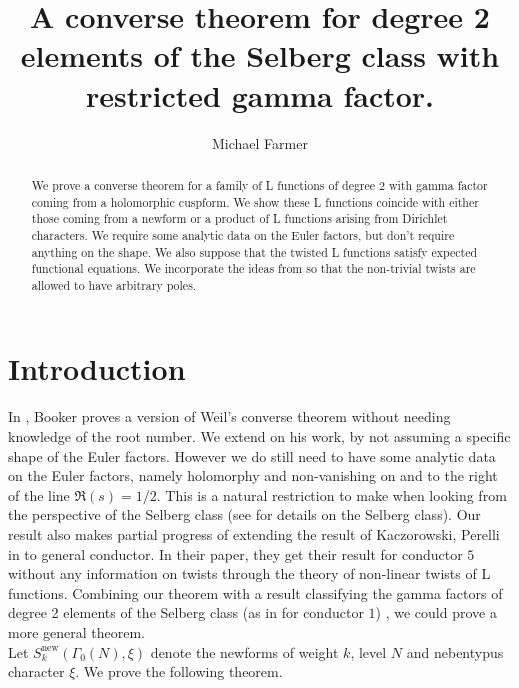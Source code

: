 \documentclass[a4paper,12.5pt]{amsart}
\title{A converse theorem for degree 2 elements of the Selberg class with restricted gamma factor.}
\author{Michael Farmer}
\theoremstyle{definition}
\theoremstyle{remark}
\begin{document}
\maketitle
\begin{abstract}
    We  prove a converse theorem for a family of L functions of degree 2  with gamma factor coming from a holomorphic cuspform. We show these L functions coincide with either those coming from a newform or a product of L functions arising from Dirichlet characters. We require some analytic data on the Euler factors, but don't require anything on the shape. We also suppose that the twisted L functions satisfy expected functional equations. We incorporate the ideas from \cite{booker2014weil} so that the non-trivial twists are allowed to have arbitrary poles. 
\end{abstract}
\section{Introduction}
In \cite{Converse}, Booker proves a version of Weil's converse theorem without needing knowledge of the root number. We extend on his work, by not assuming a specific shape of the Euler factors. However we do still need to have some analytic data on the Euler factors, namely holomorphy and non-vanishing on and to the right of the line $\Re(s)=1/2$. This is a natural restriction to make when looking from the perspective of the Selberg class (see  \cite{perelli2005survey} for details on the Selberg class).
Our result also makes partial progress of extending the result of Kaczorowski, Perelli in \cite{kaczorowski2018hecke} to general conductor. In their paper, they get their result for conductor $5$ without any information on twists through the theory of non-linear twists of L functions. Combining our theorem with a result classifying the gamma factors of degree 2 elements of the Selberg class (as in \cite{kaczorowski2020classification} for conductor $1$) , we could prove a more general theorem.   \\
Let $S_k ^{\text{new}} (\Gamma_0 (N) , \xi)$ denote the newforms of weight $k$, level $N$ and  nebentypus character $\xi$. 
We prove the following theorem. 
\end{document}

